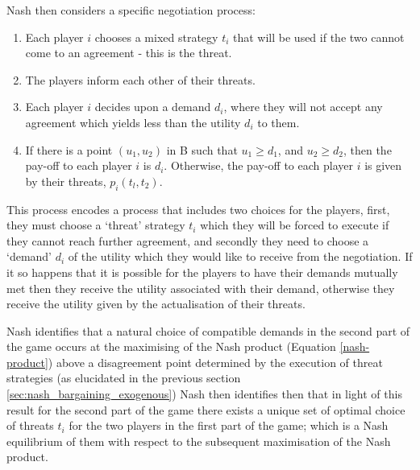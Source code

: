 Nash then considers a specific negotiation process:
\begin{enumerate}
\item Each player $i$ chooses a mixed strategy $t_i$ that will be used if the two cannot come to an agreement - this is the threat.
\item The players inform each other of their threats.
\item Each player $i$ decides upon a demand $d_i$, where they will not accept any agreement which yields less than the utility $d_i$ to them.
\item If there is a point $(u_1,u_2)$ in B such that $u_1 \ge d_1$, and $u_2 \ge d_2$, then the pay-off to each player $i$ is $d_i$. Otherwise, the pay-off to each player $i$ is given by their threats, $p_i(t_l, t_2)$.
\end{enumerate}

This process encodes a process that includes two choices for the players, first, they must choose a `threat' strategy $t_i$ which they will be forced to execute if they cannot reach further agreement, and secondly they need to choose a `demand' $d_i$ of the utility which they would like to receive from the negotiation.
If it so happens that it is possible for the players to have their demands mutually met then they receive the utility associated with their demand, otherwise they receive the utility given by the actualisation of their threats.

Nash identifies that a natural choice of compatible demands in the second part of the game occurs at the maximising of the Nash product (Equation \ref{nash-product}) above a disagreement point determined by the execution of threat strategies (as elucidated in the previous section \ref{sec:nash_bargaining_exogenous})
Nash then identifies then that in light of this result for the second part of the game there exists a unique set of optimal choice of threats $t_i$ for the two players in the first part of the game; which is a Nash equilibrium of them with respect to the subsequent maximisation of the Nash product.

